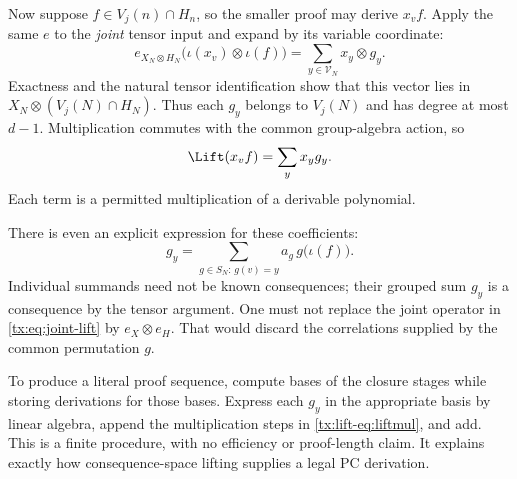 Now suppose $f\in V_j(n)\cap H_n$, so the smaller proof may derive
$x_vf$. Apply the same $e$ to the \emph{joint} tensor input and expand
by its variable coordinate:
\begin{equation}\label{tx:eq:joint-lift}
 e_{X_N\otimes H_N}\bigl(\iota(x_v)\otimes\iota(f)\bigr)
                  =\sum_{y\in\mathcal V_N}x_y\otimes g_y.
\end{equation}
Exactness and the natural tensor identification show that this vector
lies in $X_N\otimes(V_j(N)\cap H_N)$. Thus each $g_y$ belongs to
$V_j(N)$ and has degree at most $d-1$. Multiplication commutes with
the common group-algebra action, so
\begin{equation}\label{tx:lift-eq:liftmul}
                         \Lift(x_vf)=\sum_y x_yg_y.
\end{equation}
Each term is a permitted multiplication of a derivable polynomial.

There is even an explicit expression for these coefficients:
\[
            g_y=\sum_{g\in S_N:\,g(v)=y}a_g\,g\bigl(\iota(f)\bigr).
\]
Individual summands need not be known consequences; their grouped sum
$g_y$ is a consequence by the tensor argument. One must not replace the
joint operator in \eqref{tx:eq:joint-lift} by $e_X\otimes e_H$. That would
discard the correlations supplied by the common permutation $g$.

To produce a literal proof sequence, compute bases of the closure
stages while storing derivations for those bases. Express each $g_y$ in
the appropriate basis by linear algebra, append the multiplication
steps in \eqref{tx:lift-eq:liftmul}, and add. This is a finite procedure, with
no efficiency or proof-length claim. It explains exactly how
consequence-space lifting supplies a legal PC derivation.


